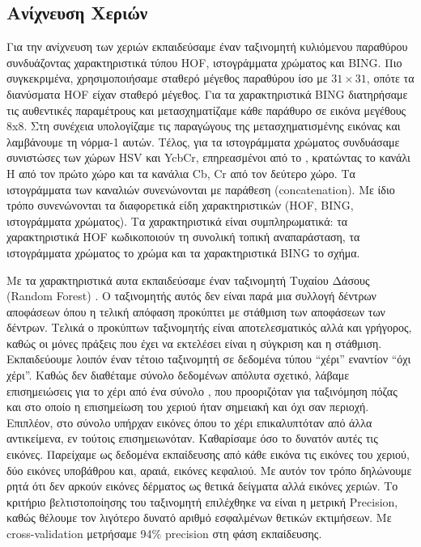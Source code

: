 \documentclass[11pt,a4paper,english,greek,twoside]{../Thesis}
\begin{document}
\subsection{Ανίχνευση Χεριών}
Για την ανίχνευση των χεριών εκπαιδεύσαμε έναν ταξινομητή κυλιόμενου παραθύρου συνδυάζοντας χαρακτηριστικά τύπου HOF, ιστογράμματα χρώματος και BING. Πιο συγκεκριμένα, χρησιμοποιήσαμε σταθερό μέγεθος παραθύρου ίσο με $31 \times 31$, οπότε τα διανύσματα HOF είχαν σταθερό μέγεθος. Για τα χαρακτηριστικά BING διατηρήσαμε τις αυθεντικές παραμέτρους και μετασχηματίζαμε κάθε παράθυρο σε εικόνα μεγέθους 8x8. Στη συνέχεια υπολογίζαμε τις παραγώγους της μετασχηματισμένης εικόνας και λαμβάνουμε τη νόρμα-1 αυτών. Τέλος, για τα ιστογράμματα χρώματος συνδυάσαμε συνιστώσες των χώρων HSV και YcbCr, επηρεασμένοι από το \cite{shaik_2015}, κρατώντας το κανάλι Η από τον πρώτο χώρο και τα κανάλια Cb, Cr από τον δεύτερο χώρο. Τα ιστογράμματα των καναλιών συνενώνονται με παράθεση (concatenation). Με ίδιο τρόπο συνενώνονται τα διαφορετικά είδη χαρακτηριστικών (HOF, BING, ιστογράμματα χρώματος). Τα χαρακτηριστικά είναι συμπληρωματικά: τα χαρακτηριστικά HOF κωδικοποιούν τη συνολική τοπική αναπαράσταση, τα ιστογράμματα χρώματος το χρώμα και τα χαρακτηριστικά BING το σχήμα.

\par Με τα χαρακτηριστικά αυτα εκπαιδεύσαμε έναν ταξινομητή Τυχαίου Δάσους (Random Forest) \cite{ho_1995}. Ο ταξινομητής αυτός δεν είναι παρά μια συλλογή δέντρων αποφάσεων όπου η τελική απόφαση προκύπτει με στάθμιση των αποφάσεων των δέντρων. Τελικά ο προκύπτων ταξινομητής είναι αποτελεσματικός αλλά και γρήγορος, καθώς οι μόνες πράξεις που έχει να εκτελέσει είναι η σύγκριση και η στάθμιση. Εκπαιδεύουμε λοιπόν έναν τέτοιο ταξινομητή σε δεδομένα τύπου “χέρι” εναντίον “όχι χέρι”. Καθώς δεν διαθέταμε σύνολο δεδομένων απόλυτα σχετικό, λάβαμε επισημειώσεις για το χέρι από ένα σύνολο \cite{rohrbach_2012}, \cite{amin_2013} που προοριζόταν για ταξινόμηση πόζας και στο οποίο η επισημείωση του χεριού ήταν σημειακή και όχι σαν περιοχή. Επιπλέον, στο σύνολο υπήρχαν εικόνες όπου το χέρι επικαλυπτόταν από άλλα αντικείμενα, εν τούτοις επισημειωνόταν. Καθαρίσαμε όσο το δυνατόν αυτές τις εικόνες. Παρείχαμε ως δεδομένα εκπαίδευσης από κάθε εικόνα τις εικόνες του χεριού, δύο εικόνες υποβάθρου και, αραιά, εικόνες κεφαλιού. Με αυτόν τον τρόπο δηλώνουμε ρητά ότι δεν αρκούν εικόνες δέρματος ως θετικά δείγματα αλλά εικόνες χεριών. Το κριτήριο βελτιστοποίησης του ταξινομητή επιλέχθηκε να είναι η μετρική Precision, καθώς θέλουμε τον λιγότερο δυνατό αριθμό εσφαλμένων θετικών εκτιμήσεων. Με cross-validation μετρήσαμε 94\% precision στη φάση εκπαίδευσης.
\end{document}
